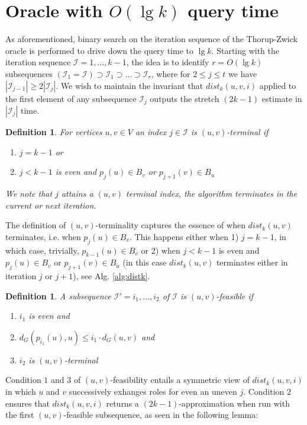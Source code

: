 \documentclass[12pt]{article}
\newtheorem{defi}[thm]{Definition}
\begin{document}
\section{Oracle with $O(\lg k)$ query time}
As aforementioned, binary search on the iteration sequence of the Thorup-Zwick oracle is performed to drive down the query time to $\lg k$. Starting with the iteration sequence $\mathcal{I}=1,\hdots,k-1$, the idea is to identify $r=O(\lg k)$ subsequences $(\mathcal{I}_1=\mathcal{I}) \supset \mathcal{I}_1 \supset \hdots \supset \mathcal{I}_r$, where for $2 \leq j \leq t$ we have $|\mathcal{I}_{j-1}| \geq 2|\mathcal{I}_j|$. We wish to maintain the invariant that $dist_k(u,v,i)$ applied to the first element of any subsequence $\mathcal{I}_j$ outputs the stretch $(2k-1)$ estimate in $|\mathcal{I}_j|$ time.
\\
\begin{defi}
For vertices $u,v \in V$ an index $j \in \mathcal{I}$ is $(u,v)$-terminal if
\begin{enumerate}
\item $j = k-1$ or
\item $j < k-1$ is even and $p_j(u) \in B_v$ or $p_{j+1}(v) \in B_u$ 
\end{enumerate}
We note that $j$ attains a $(u,v)$ terminal index, the algorithm terminates in the current or next iteration. \label{def:uvterm}
\end{defi}
The definition of $(u,v)$-terminality captures the essence of when $dist_k(u,v)$ terminates, i.e. when $p_j(u) \in B_v$. This happens either when 1) $j=k-1$, in which case, trivially, $p_{k-1}(u) \in B_v$ or 2) when $j < k-1$ is even and $p_j(u) \in B_v$ or $p_{j+1}(v) \in B_u$ (in this case $dist_k(u,v)$ terminates either in iteration $j$ or $j+1$), see Alg. \ref{alg:distk}.
\\
\begin{defi}
A subsequence $\mathcal{I'}=i_1, \hdots, i_2$ of $\mathcal{I}$ is $(u,v)$-feasible if
\begin{enumerate}
\item $i_1$ is even and
\item $d_{G}(p_{i_1}(u),u) \leq i_1 \cdot d_G(u,v)$ and
\item $i_2$ is $(u,v)$-terminal
\end{enumerate}
\label{def:uvfeas}
\end{defi}
Condition $1$ and $3$ of $(u,v)$-feasibility entails a symmetric view of $dist_k(u,v,i)$ in which $u$ and $v$ successively exhanges roles for even an uneven $j$. Condition $2$ ensures that $dist_k(u,v,i)$ returns a $(2k-1)$-approximation when run with the first  $(u,v)$-feasible subsequence, as seen in the following lemma:
\end{document}
